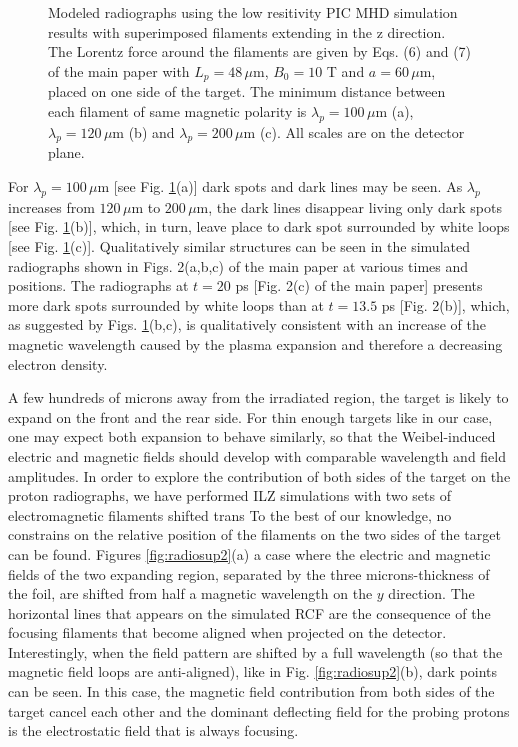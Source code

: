 \documentclass[aps,showpacs,superscriptaddress]{revtex4}
\begin{document}
\begin{figure}[ht]
{\begin{tabular}{ccc}
\end{tabular}}
\caption{\label{fig:radiosup}  
Modeled radiographs using the low resitivity PIC MHD simulation results  with superimposed filaments extending in the z direction.
The Lorentz force around the  filaments  are given by Eqs. (6) and (7) of the main paper with $L_p = 48 \, \mu$m, $B_0= 10$ T and $a = 60\, \mu$m, placed on one side of the target.
The minimum distance between each filament of same magnetic polarity is $ \lambda_p =100\, \mu$m  (a), $ \lambda_p =120\, \mu$m  (b) and $ \lambda_p =200\, \mu$m   (c).
All scales are on the detector plane.
}
\end{figure}
For  $ \lambda_p =100\, \mu$m [see Fig. \ref{fig:radiosup}(a)]  dark spots and dark lines  may be seen. As  $ \lambda_p$ increases from $120\, \mu$m  to   $ 200\, \mu$m, the dark lines disappear living only dark spots [see Fig. \ref{fig:radiosup}(b)], which, in turn, leave place to dark spot surrounded by white loops [see Fig. \ref{fig:radiosup}(c)]. Qualitatively similar structures can be seen in the simulated radiographs shown in Figs. 2(a,b,c) of the main paper at various times and positions. 
The radiographs at $t =20$ ps  [Fig. 2(c) of the main paper] presents more dark spots surrounded by white loops than at $t= 13.5$ ps  [Fig. 2(b)],  which, as suggested by Figs. \ref{fig:radiosup}(b,c), is qualitatively consistent with  an increase of the magnetic wavelength caused by the plasma expansion and therefore a decreasing electron density.

A few hundreds of microns away from the irradiated region, the target is likely to expand on the front and the rear side. 
For thin enough targets like in our case, one may expect both expansion to behave similarly, so that the  Weibel-induced electric and magnetic fields should develop with comparable wavelength and field amplitudes. 
In order to explore the contribution of both  sides of the target on the proton radiographs, we have performed ILZ simulations with two  sets of electromagnetic filaments shifted trans
To the best of our knowledge, no constrains on the relative position of the filaments on the two sides of the target can be found. 
Figures \ref{fig:radiosup2}(a) a case where the electric and magnetic fields of the two expanding region, separated by the three microns-thickness of the foil,  are shifted from half a magnetic wavelength on the $y$ direction. The horizontal lines that appears on the simulated RCF are the consequence of the focusing filaments that become aligned when projected on the detector.
Interestingly, when the field pattern are shifted by a full wavelength (so that the magnetic field loops are anti-aligned), like in  Fig. \ref{fig:radiosup2}(b),  dark points can be seen. In this case, the magnetic field contribution from both sides of the target cancel each other and the dominant deflecting field for the probing protons is the  electrostatic field that is always focusing.
 
\end{document}
